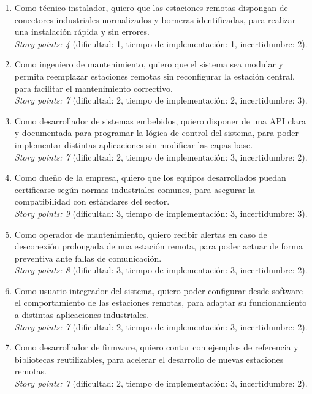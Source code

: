 \documentclass[
11pt, %
]{charter}
\begin{document}
\begin{enumerate}
	\item Como técnico instalador, quiero que las estaciones remotas dispongan de conectores industriales normalizados y borneras identificadas, para realizar una instalación rápida y sin errores.\\
	\textit{Story points: 4} (dificultad: 1, tiempo de implementación: 1, incertidumbre: 2).
	
	\item Como ingeniero de mantenimiento, quiero que el sistema sea modular y permita reemplazar estaciones remotas sin reconfigurar la estación central, para facilitar el mantenimiento correctivo.\\
	\textit{Story points: 7} (dificultad: 2, tiempo de implementación: 2, incertidumbre: 3).
	
	\item Como desarrollador de sistemas embebidos, quiero disponer de una API clara y documentada para programar la lógica de control del sistema, para poder implementar distintas aplicaciones sin modificar las capas base.\\
	\textit{Story points: 7} (dificultad: 2, tiempo de implementación: 3, incertidumbre: 2).
	
	\item Como dueño de la empresa, quiero que los equipos desarrollados puedan certificarse según normas industriales comunes, para asegurar la compatibilidad con estándares del sector.\\
	\textit{Story points: 9} (dificultad: 3, tiempo de implementación: 3, incertidumbre: 3).
	
	\item Como operador de mantenimiento, quiero recibir alertas en caso de desconexión prolongada de una estación remota, para poder actuar de forma preventiva ante fallas de comunicación.\\
	\textit{Story points: 8} (dificultad: 3, tiempo de implementación: 3, incertidumbre: 2).
	
	\item Como usuario integrador del sistema, quiero poder configurar desde software el comportamiento de las estaciones remotas, para adaptar su funcionamiento a distintas aplicaciones industriales.\\
	\textit{Story points: 7} (dificultad: 2, tiempo de implementación: 3, incertidumbre: 2).
	
	\item Como desarrollador de firmware, quiero contar con ejemplos de referencia y bibliotecas reutilizables, para acelerar el desarrollo de nuevas estaciones remotas.\\
	\textit{Story points: 7} (dificultad: 2, tiempo de implementación: 3, incertidumbre: 2).
\end{enumerate}
\end{document}
